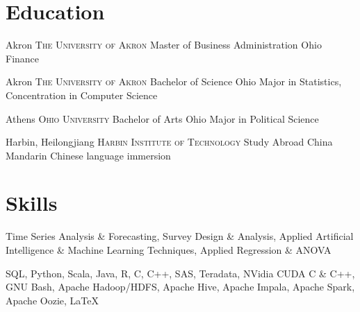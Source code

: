 \documentclass[letterpaper,12pt,color,final]{moderncv}
\begin{document}
\section{Education}

{Akron}
{\textsc{The University of Akron}}
{Master of Business Administration}
{Ohio}
{Finance}

{Akron}
{\textsc{The University of Akron}}
{Bachelor of Science}
{Ohio}
{Major in Statistics, Concentration in Computer Science}

{Athens}
{\textsc{Ohio University}}
{Bachelor of Arts}
{Ohio}
{Major in Political Science}

{Harbin, Heilongjiang}
{\textsc{Harbin Institute of Technology}}
{Study Abroad}
{China}
{Mandarin Chinese language immersion}

\section{Skills}

{\newline{}
 Time Series Analysis \& Forecasting, Survey Design \& Analysis, Applied Artificial Intelligence \& Machine Learning Techniques, Applied Regression \& ANOVA}

{\newline{}
 SQL, Python, Scala, Java, R, C, C++, SAS, Teradata, NVidia CUDA C \& C++, GNU Bash, Apache Hadoop/HDFS, Apache Hive, Apache Impala, Apache Spark, Apache Oozie, \LaTeX{}}
\end{document}
